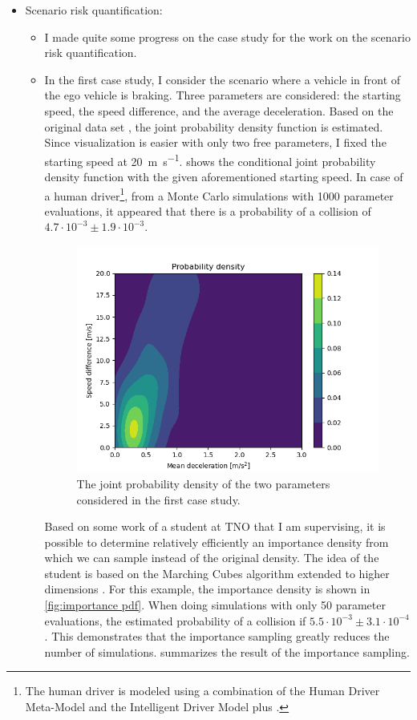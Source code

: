 \documentclass[10pt,final,a4paper,oneside,onecolumn]{article}
\begin{document}
\begin{itemize}
	\item Scenario risk quantification:
	\begin{itemize}
		\item I made quite some progress on the case study for the work on the scenario risk quantification. 
		
		\item In the first case study, I consider the scenario where a vehicle in front of the ego vehicle is braking. Three parameters are considered: the starting speed, the speed difference, and the average deceleration. Based on the original data set \autocite{paardekooper2019dataset6000km}, the joint probability density function is estimated. Since visualization is easier with only two free parameters, I fixed the starting speed at \SI{20}{\meter\per\second}.  shows the conditional joint probability density function with the given aforementioned starting speed. In case of a human driver\footnote{The human driver is modeled using a combination of the Human Driver Meta-Model \autocite{treiber2006delays} and the Intelligent Driver Model plus \autocite{schakel2010effects}.}, from a Monte Carlo simulations with 1000 parameter evaluations, it appeared that there is a probability of a collision of $4.7 \cdot 10^{-3} \pm 1.9 \cdot 10^{-3}$.
		
		\begin{figure}
			\centering
			\includegraphics[width=.8\linewidth]{orig_pdf}
			\caption{The joint probability density of the two parameters considered in the first case study.}
			\label{fig:original pdf}
		\end{figure}
	
		Based on some work of a student at TNO that I am supervising, it is possible to determine relatively efficiently an importance density from which we can sample instead of the original density. The idea of the student is based on the Marching Cubes algorithm \autocite{lorensen1987marching} extended to higher dimensions \autocite{bhaniramka2004isosurface}. For this example, the importance density is shown in \cref{fig:importance pdf}. When doing simulations with only 50 parameter evaluations, the estimated probability of a collision if $5.5 \cdot 10^{-3} \pm 3.1\cdot 10^{-4}$. This demonstrates that the importance sampling greatly reduces the number of simulations.  summarizes the result of the importance sampling.
		

\end{itemize}
\end{itemize}
\end{document}
